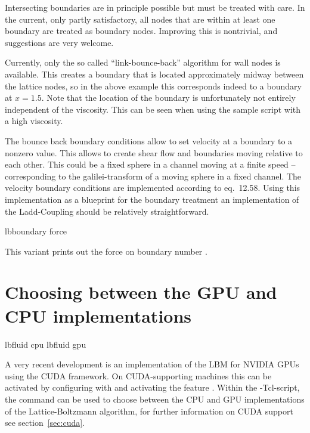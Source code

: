Intersecting boundaries are in principle possible but must be treated
with care. 
In the current, only partly satisfactory, all nodes that are within at least
one boundary are treated as boundary nodes. Improving this is nontrivial, 
and suggestions are very welcome.

Currently, only the so called ``link-bounce-back'' algorithm for wall
nodes is available. This creates a boundary that is located
approximately midway between the lattice nodes, so in the above
example this corresponds indeed to a boundary at $x=1.5$. Note that
the location of the boundary is unfortunately not entirely independent of the
viscosity. This can \eg be seen when using the sample script
 with a high viscosity.

The bounce back boundary conditions allow to set velocity at a boundary to a nonzero
value. This allows to create shear flow and boundaries moving relative to 
each other. This could be a fixed sphere in a channel moving at a finite speed -- 
corresponding to the galilei-transform of a moving sphere in a fixed channel.
The velocity boundary conditions are implemented according to \cite{succi01a}
eq.~12.58. Using this implementation as a blueprint for the boundary treatment 
an implementation of the Ladd-Coupling should be relatively straightforward.

\begin{essyntax}
  lbboundary force 
  \begin{features}
  \end{features}
\end{essyntax}
This variant prints out the force on boundary number .

\section{Choosing between the GPU and CPU implementations}
\begin{essyntax}
   lbfluid cpu
   lbfluid gpu
  \begin{features}
  \end{features}
\end{essyntax}

A very recent development is an implementation of the LBM for NVIDIA
GPUs using the CUDA framework.  On CUDA-supporting machines this can
be activated by configuring with  and activating the feature .
Within the \es-Tcl-script, the  command can be used to
choose between the CPU and GPU implementations of the
Lattice-Boltzmann algorithm, for further information on CUDA support
see section~\ref{sec:cuda}.

